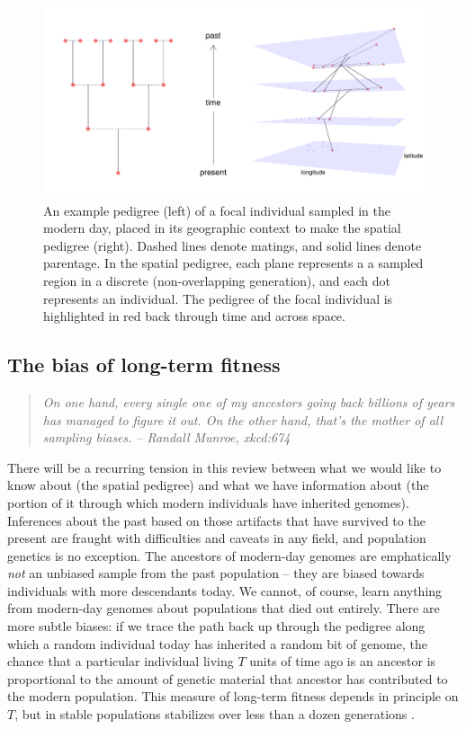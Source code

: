 \documentclass{ar-1col}
\newcommand{\plr}[1]{{\color{green}{#1}}}
\begin{document}
\begin{figure}[ht]
    \centering
         \includegraphics[width=\linewidth]{figs/spatial_pedigree.pdf}
        \caption{
		An example pedigree (left) of a focal individual sampled in the modern day, 
	   	placed in its geographic context to make the spatial pedigree (right).
		Dashed lines denote matings, and solid lines denote parentage.
		In the spatial pedigree, 
		each plane represents a a sampled region in a discrete (non-overlapping generation),
		and each dot represents an individual.
		The pedigree of the focal individual is highlighted in red 
		back through time and across space.
        }
        \label{spatial_pedigree}
\end{figure}

\subsection{The bias of long-term fitness}


\begin{quote}
    \textit{
    On one hand, every single one of my ancestors going back billions of years
    has managed to figure it out.
    On the other hand, that's the mother of all sampling biases.}
    \hfill \textit{-- Randall Munroe, xkcd:674}
\end{quote}

There will be a recurring tension in this review
between what we would like to know about (the spatial pedigree)
and what we have information about 
(the portion of it through which modern individuals have inherited genomes).
Inferences about the past
based on those artifacts that have survived to the present
are fraught with difficulties and caveats in any field, 
and population genetics is no exception.
The ancestors of modern-day genomes are emphatically \textit{not} an unbiased sample
from the past population -- 
they are biased towards individuals with more descendants today.
We cannot, of course, learn anything from modern-day genomes
about populations that died out entirely.
There are more subtle biases:
if we trace the path back up through the pedigree 
along which a random individual today has inherited a random bit of genome,
the chance that a particular individual living $T$ units of time ago is an ancestor
is proportional to the amount of genetic material that ancestor has contributed to the modern population.
This measure of long-term fitness depends in principle on $T$,
but in stable populations stabilizes over less than a dozen generations \citep{BartonEtheridge2011fitness} \plr{check that!}.
\end{document}

